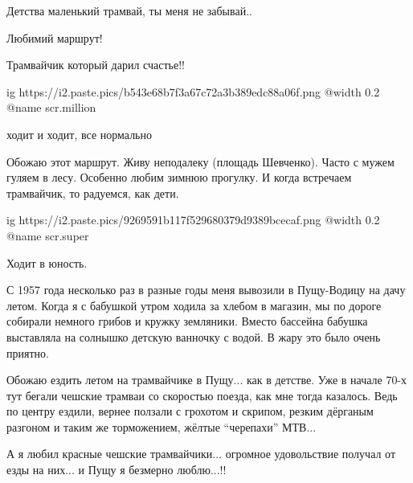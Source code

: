  
 
 
 
 
\zzSecCmt

\begin{itemize} %
Детства маленький трамвай, ты меня не забывай..

Любимий маршрут!

Трамвайчик который дарил счастье!!


\ifcmt
  ig https://i2.paste.pics/b543e68b7f3a67c72a3b389edc88a06f.png
  @width 0.2
  @name scr.million
\fi

ходит и ходит, все нормально


Обожаю этот маршрут. Живу неподалеку (площадь Шевченко). Часто с мужем гуляем в
лесу. Особенно любим зимнюю прогулку. И когда встречаем трамвайчик, то
радуемся, как дети.



\ifcmt
  ig https://i2.paste.pics/9269591b117f529680379d9389bcecaf.png
  @width 0.2
  @name scr.super
\fi

Ходит в юность.


С 1957 года несколько раз в разные годы меня вывозили в Пущу-Водицу на дачу
летом. Когда я с бабушкой утром ходила за хлебом в магазин, мы по дороге
собирали немного грибов и кружку земляники. Вместо бассейна бабушка выставляла
на солнышко детскую ванночку с водой. В жару это было очень приятно.



Обожаю ездить летом на трамвайчике в Пущу... как в детстве. Уже в начале 70-х
тут бегали чешские трамваи со скоростью поезда, как мне тогда казалось. Ведь по
центру ездили, вернее ползали с грохотом и скрипом, резким дёрганым разгоном и
таким же торможением, жёлтые \enquote{черепахи} МТВ...

А я любил красные чешские трамвайчики... огромное удовольствие получал от езды
на них... и Пущу я безмерно люблю...!!



\end{itemize}
